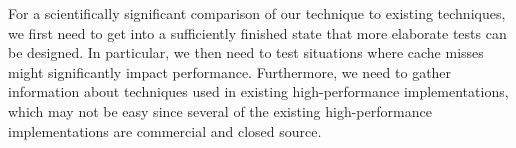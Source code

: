 For a scientifically significant comparison of our technique to
existing techniques, we first need to get \sicl{} into a sufficiently
finished state that more elaborate tests can be designed.  In
particular, we then need to test situations where cache misses might
significantly impact performance.  Furthermore, we need to gather
information about techniques used in existing high-performance
implementations, which may not be easy since several of the existing
high-performance implementations are commercial and closed source.
